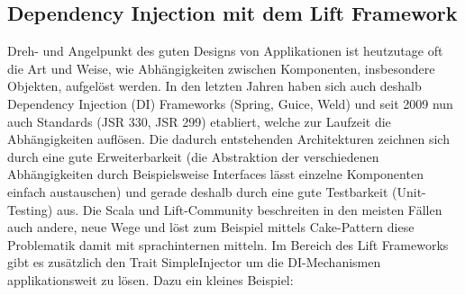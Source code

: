 \subsection{Dependency Injection mit dem Lift Framework}
Dreh- und Angelpunkt des guten Designs von Applikationen ist heutzutage oft die Art und Weise, wie Abh\"angigkeiten zwischen Komponenten, insbesondere Objekten, aufgel\"ost werden. In den letzten Jahren haben sich auch deshalb Dependency Injection (DI) Frameworks (Spring, Guice, Weld) und seit 2009 nun auch Standards (JSR 330, JSR 299) etabliert, welche zur Laufzeit die Abh\"angigkeiten aufl\"osen. Die dadurch entstehenden Architekturen zeichnen sich durch eine gute Erweiterbarkeit (die Abstraktion der verschiedenen Abh\"angigkeiten durch Beispielsweise Interfaces l\"asst einzelne Komponenten einfach austauschen) und gerade deshalb durch eine gute Testbarkeit (Unit-Testing) aus. Die Scala und Lift-Community beschreiten in den meisten F\"allen auch andere, neue Wege und l\"ost zum Beispiel mittels Cake-Pattern\cite{bonerCakePattern}\cite{oderskyCakePattern} diese Problematik damit mit sprachinternen mitteln. Im Bereich des Lift Frameworks gibt es zus\"atzlich den Trait SimpleInjector um  die DI-Mechanismen applikationsweit zu l\"osen. Dazu ein kleines Beispiel:

